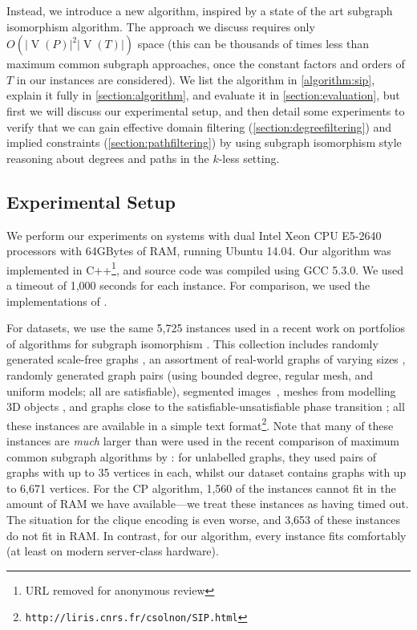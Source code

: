 \documentclass[letterpaper]{article}
\newcommand{\citet}[1]{\citeauthor{#1} \shortcite{#1}}
\theoremstyle{definition}
\newcommand{\V}{\operatorname{V}}
\begin{document}
Instead, we introduce a new algorithm, inspired by a state of the art subgraph isomorphism
algorithm. The approach we discuss requires only $O(\left|\V(P)\right|^2\left|\V(T)\right|)$ space
(this can be thousands of times less than maximum common subgraph approaches, once the constant
factors and orders of $T$ in our instances are considered). We list the algorithm in
\cref{algorithm:sip}, explain it fully in \cref{section:algorithm}, and evaluate it in
\cref{section:evaluation}, but first we will discuss our experimental setup, and then detail some
experiments to verify that we can gain effective domain filtering (\cref{section:degreefiltering})
and implied constraints (\cref{section:pathfiltering}) by using subgraph isomorphism style reasoning
about degrees and paths in the $k$-less setting.

\subsection{Experimental Setup} \label{section:setup}

We perform our experiments on systems with dual Intel Xeon CPU E5-2640 processors with 64GBytes of
RAM, running Ubuntu 14.04. Our algorithm was implemented in C++\footnote{URL removed for anonymous
review}, and source code was compiled using
GCC 5.3.0. We used a timeout of 1,000 seconds for each instance. For comparison, we used the
implementations of \citet{DBLP:conf/cp/McCreeshNPS16}.

For datasets, we use the same 5,725 instances used in a recent work on portfolios of algorithms for
subgraph isomorphism \cite{thelionpaper}. This collection includes randomly generated scale-free
graphs \cite{constraints10}, an assortment of real-world graphs of varying sizes \cite{LV02},
randomly generated graph pairs (using bounded degree, regular mesh, and uniform models; all are
satisfiable), segmented images~\cite{pr15,cviu11}, meshes from modelling 3D objects \cite{cviu11},
and graphs close to the satisfiable-unsatisfiable phase transition
\cite{DBLP:conf/ijcai/McCreeshPT16}; all these instances are available in a simple text
format\footnote{\texttt{http://liris.cnrs.fr/csolnon/SIP.html}}.  Note that many of these instances
are \emph{much} larger than were used in the recent comparison of maximum common subgraph algorithms
by \citet{DBLP:conf/cp/McCreeshNPS16}: for unlabelled graphs, they used pairs of graphs with up to
35 vertices in each, whilst our dataset contains graphs with up to 6,671 vertices. For the CP
algorithm, 1,560 of the instances cannot fit in the amount of RAM we have available---we treat these
instances as having timed out. The situation for the clique encoding is even worse, and 3,653 of
these instances do not fit in RAM. In contrast, for our algorithm, every instance fits comfortably
(at least on modern server-class hardware).
\end{document}
